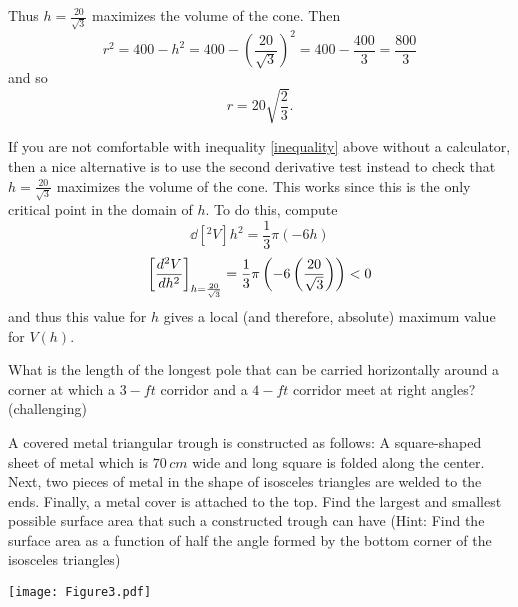 \documentclass[handout,nooutcomes]{ximera}
\begin{document}
\begin{problem}
\begin{freeResponse}
		Thus $h=\frac{20}{\sqrt{3}}$ maximizes the volume of the cone.  Then 
		$$r^2 = 400 - h^2 = 400 - \left( \frac{20}{\sqrt{3}} \right)^2 = 400 - \frac{400}{3} = \frac{800}{3}$$
		and so
		$$ r = 20 \sqrt{\frac{2}{3}}. $$
		
		If you are not comfortable with inequality \eqref{inequality} above without a calculator, then a nice alternative is to use the second derivative test instead to check that $h=\frac{20}{\sqrt{3}}$ maximizes the volume of the cone.  This works since this is the only critical point in the domain of $h$.  To do this, compute
		$$ \dd[^2V]{h^2} = \frac{1}{3} \pi (-6h) $$
		$$ \eval{\dd[^2V]{h^2}}_{h=\frac{20}{\sqrt{3}}} = \frac{1}{3} \pi \left( -6 \left(\frac{20}{\sqrt{3}} \right) \right) < 0 $$
		and thus this value for $h$ gives a local (and therefore, absolute) maximum value for $V(h)$.  
		
		\end{freeResponse}
		
		
		

\end{problem}
	


	
	
\begin{center}		\end{center}
	
			
			

\begin{problem}
What is the length of the longest pole that can be carried horizontally around a corner at which a $3-ft$ corridor and a $4-ft$ corridor meet at right angles? (challenging)
\end{problem}



\begin{problem}
A covered metal triangular trough is constructed as follows:  A square-shaped sheet of metal which is $70 \, cm$ wide and long square is folded along the center.  Next, two pieces of metal in the shape of isosceles triangles are welded to the ends.  Finally, a metal cover is attached to the top.  Find the largest and smallest possible surface area that such a constructed trough can have (Hint:  Find the surface area as a function of half the angle formed by the bottom corner of the isosceles triangles)

		\begin{image}
		\texttt{[image: Figure3.pdf]}
		\end{image}
\end{problem}
\end{document}
